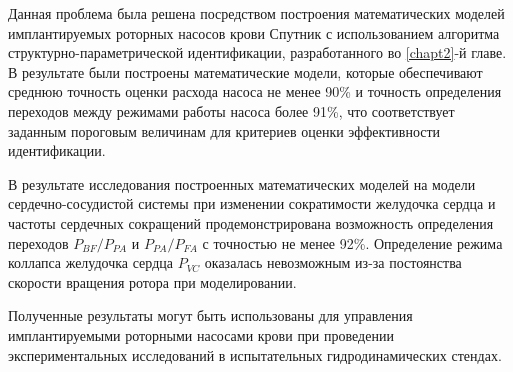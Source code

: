 Данная проблема была решена посредством построения математических моделей имплантируемых роторных насосов крови Спутник с использованием алгоритма структурно-параметрической идентификации, разработанного во \ref{chapt2}-й главе. В результате были построены математические модели, которые обеспечивают среднюю точность оценки расхода насоса не менее 90\% и точность определения переходов между режимами работы насоса более 91\%, что соответствует заданным пороговым величинам для критериев оценки эффективности идентификации. 

В результате исследования построенных математических моделей на модели сердечно-сосудистой системы при изменении сократимости желудочка сердца и частоты сердечных сокращений продемонстрирована возможность определения переходов $P_{BF}/P_{PA}$ и $P_{PA}/P_{FA}$ с точностью не менее 92\%. Определение режима коллапса желудочка сердца $P_{VC}$ оказалась невозможным из-за постоянства скорости вращения ротора при моделировании.    


Полученные результаты могут быть использованы для управления имплантируемыми роторными насосами крови при проведении экспериментальных исследований в испытательных гидродинамических стендах. 

